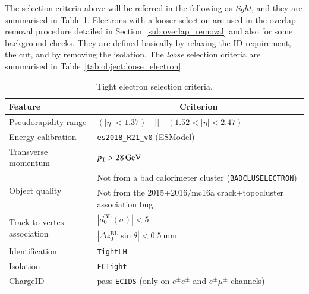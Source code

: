 The selection criteria above will be referred in the following as \textit{tight}, and they are summarised in Table \ref{tab:object:electron}. Electrons with a looser selection are used in the overlap removal procedure detailed in Section~\ref{sub:overlap_removal} and also for some background checks. They are defined basically by relaxing the ID requirement, the \pT cut, and by removing the isolation. The \textit{loose} selection criteria are summarised in Table~\ref{tab:object:loose_electron}.


\begin{table}[ht]
  \caption{Tight electron selection criteria.}%
  \label{tab:object:electron}
  \centering
  \begin{tabular}{ll}
    \toprule
    Feature & \multicolumn{1}{c}{Criterion} \\
    \midrule
    Pseudorapidity range & \((|\eta| < 1.37) \quad || \quad (1.52 < |\eta| < 2.47)\) \\
    Energy calibration & \texttt{es2018\_R21\_v0} (ESModel)\\
    Transverse momentum & \(\pT > \SI[parse-numbers=false]{28}{\GeV}\) \\
    \midrule
    \multirow{2}{*}{Object quality} & Not from a bad calorimeter cluster (\texttt{BADCLUSELECTRON}) \\ %
      & Not from the 2015+2016/mc16a crack+topocluster association bug   \\
    \midrule
    \multirow{2}{*}{Track to vertex association} & \(|d_{0}^{\text{BL}}(\sigma)| < 5\) \\ %
    & \(|\Delta z_{0}^{\text{BL}} \sin{\theta}| < \SI[parse-numbers=false]{0.5}{\mm}\) \\
    \midrule
    Identification & \texttt{TightLH} \\
    Isolation & \texttt{FCTight } \\
    ChargeID & pass \texttt{ECIDS}  (only on $e^\pm e^\pm$ and  $e^\pm \mu^\pm$ channels)\\
      \bottomrule
  \end{tabular}
\end{table}


